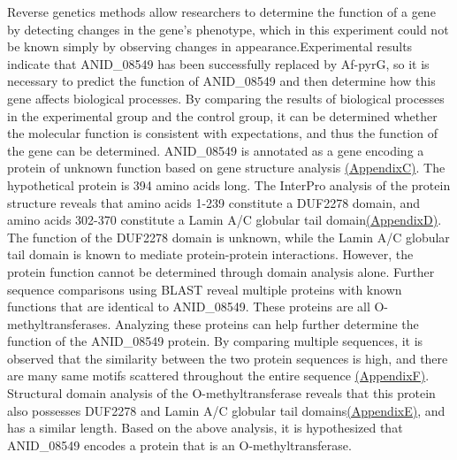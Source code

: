 \documentclass[a4paper,10pt]{article}
\begin{document}
\begin{multicols}{2}
Reverse genetics methods allow researchers to determine the function of a gene by detecting changes in the gene's phenotype, which in this experiment could not be known simply by observing changes in appearance.Experimental results indicate that ANID\_08549 has been successfully replaced by Af-pyrG, so it is necessary to predict the function of ANID\_08549 and then determine how this gene affects biological processes. By comparing the results of biological processes in the experimental group and the control group, it can be determined whether the molecular function is consistent with expectations, and thus the function of the gene can be determined. ANID\_08549 is annotated as a gene encoding a protein of unknown function based on gene structure analysis \hyperref[secC]{(AppendixC)}\cite{wortman20092008}. The hypothetical protein is 394 amino acids long. The InterPro analysis of the protein structure reveals that amino acids 1-239 constitute a DUF2278 domain, and amino acids 302-370 constitute a Lamin A/C globular tail domain\hyperref[secD]{(AppendixD)}\cite{paysan2023interpro}. The function of the DUF2278 domain is unknown, while the Lamin A/C globular tail domain is known to mediate protein-protein interactions. However, the protein function cannot be determined through domain analysis alone. Further sequence comparisons using BLAST reveal multiple proteins with known functions that are identical to ANID\_08549. These proteins are all O-methyltransferases. Analyzing these proteins can help further determine the function of the ANID\_08549 protein. By comparing multiple sequences, it is observed that the similarity between the two protein sequences is high, and there are many same motifs scattered throughout the entire sequence \hyperref[secF]{(AppendixF)}. Structural domain analysis of the O-methyltransferase reveals that this protein also possesses DUF2278 and Lamin A/C globular tail domains\hyperref[secE]{(AppendixE)}, and has a similar length. Based on the above analysis, it is hypothesized that ANID\_08549 encodes a protein that is an O-methyltransferase.


\end{multicols}
\end{document}
